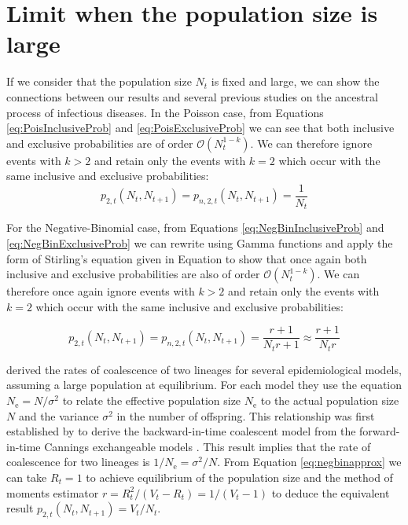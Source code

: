 \documentclass{article}
\renewcommand{\eqref}[1]{\ref{#1}}
\begin{document}
\section{Limit when the population size is large}

If we consider that the population size $N_t$ is fixed and large, we can show the connections
between our results and several previous studies on the ancestral process of infectious diseases.
In the Poisson case, from Equations \eqref{eq:PoisInclusiveProb} and \eqref{eq:PoisExclusiveProb} we can see that both inclusive and exclusive probabilities
are of order $\mathcal{O}(N_t^{1-k})$. We can therefore ignore events with $k>2$
and retain only the events with $k=2$ which occur with the same inclusive and exclusive
probabilities:
\begin{equation}
p_{2,t}(N_t, N_{t+1})=p_{n,2,t}(N_t, N_{t+1})=\frac{1}{N_t}\label{eq:poissonapprox}
\end{equation}

For the Negative-Binomial case, from Equations \eqref{eq:NegBinInclusiveProb} and \eqref{eq:NegBinExclusiveProb} we can rewrite using Gamma functions and apply the 
form of Stirling's equation given in Equation  to show that 
once again both inclusive and exclusive probabilities are also of order $\mathcal{O}(N_t^{1-k})$. 
We can therefore once again ignore events with $k>2$
and retain only the events with $k=2$ which occur with the same inclusive and 
exclusive probabilities:

\begin{equation}
p_{2,t}(N_t, N_{t+1})=p_{n,2,t}(N_t, N_{t+1})=\frac{r+1}{N_t r +1} \approx \frac{r+1}{N_t r}\label{eq:negbinapprox}
\end{equation}

\citet{koelleRatesCoalescenceCommon2012} derived the rates of coalescence of two lineages 
for several epidemiological models, assuming a large population at equilibrium.
For each model they use the equation $N_\mathrm{e}=N/\sigma^2$ to relate the effective population
size $N_\mathrm{e}$ to the actual population size $N$ and the variance $\sigma^2$ in the number
of offspring. This relationship was first established by \citet{Kingman1982} to
derive the backward-in-time coalescent model from the forward-in-time
Cannings exchangeable models \citep{Cannings1974}. 
This result implies that the rate of coalescence for two lineages is 
$1/N_\mathrm{e}=\sigma^2/N$.
From Equation \eqref{eq:negbinapprox} we can take $R_t=1$ to achieve 
equilibrium of the population size and the method of moments estimator
$r=R_t^2/(V_t-R_t)=1/(V_t-1)$ to deduce 
the equivalent result $p_{2,t}(N_t,N_{t+1})=V_t/N_t$. 
\end{document}
